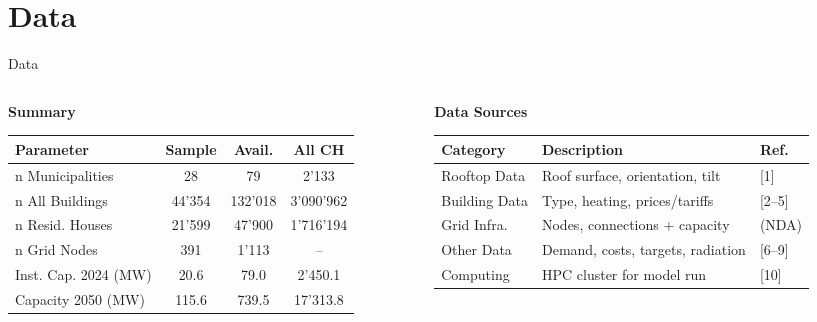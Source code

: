 \documentclass[10pt, aspectratio=169]{beamer}
\begin{document}
\section{Data}

\begin{frame}{Data}

\begin{columns}[t]
\begin{column}{0.48\textwidth}

  \centering\textbf{Summary}\\
  \vspace{0.2cm}
  {\scriptsize
  \setlength{\tabcolsep}{3.5pt}
  \renewcommand{\arraystretch}{1.15}
  \begin{tabular}{l c c c}
    \hline
    \textbf{Parameter} & \textbf{Sample} & \textbf{Avail.} & \textbf{All CH} \\
    \hline
    n Municipalities         & 28     & 79      & 2'133     \\
    n All Buildings          & 44'354 & 132'018 & 3'090'962 \\
    n Resid. Houses          & 21'599 & 47'900  & 1'716'194 \\
    n Grid Nodes             & 391    & 1'113   & --        \\
    Inst. Cap. 2024 (MW)     & 20.6   & 79.0    & 2'450.1   \\
    Capacity 2050 (MW)       & 115.6  & 739.5   & 17'313.8  \\
    \hline
  \end{tabular}
  }

\end{column}
\begin{column}{0.48\textwidth}

  \centering\textbf{Data Sources}\\
  \vspace{0.2cm}
  {\scriptsize
  \setlength{\tabcolsep}{3.5pt}
  \renewcommand{\arraystretch}{1.15}
  \begin{tabular}{l l l}
    \hline
    \textbf{Category} & \textbf{Description} & \textbf{Ref.} \\
    \hline
    Rooftop Data      & Roof surface, orientation, tilt             & [1]     \\
    Building Data     & Type, heating, prices/tariffs               & [2--5]  \\
    Grid Infra.       & Nodes, connections + capacity               & (NDA)   \\
    Other Data        & Demand, costs, targets, radiation           & [6--9]  \\
    Computing         & HPC cluster for model run                   & [10]    \\
    \hline
  \end{tabular}
  \vspace{0.2cm}
  }


\end{column}
\end{columns}
\end{frame}
\end{document}
